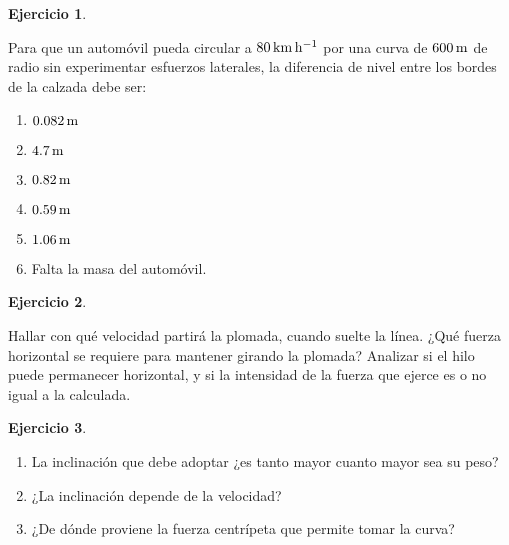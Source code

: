 \documentclass[a4paper,12pt,twoside]{book}
\newtheorem{ejercicio}{{Ejercicio}}[chapter]
\begin{document}
\begin{mdframed}[style=ejercicio-intermedio]
    \begin{ejercicio}
    \end{ejercicio}
    Para que un automóvil pueda circular a $80 \, \si{\kilo\metre\per\hour}$ por una curva de $600 \, \si{\metre}$ de radio sin experimentar esfuerzos laterales, la diferencia de nivel entre los bordes de la calzada debe ser:
    \begin{enumerate}
        \item $0.082 \, \si{\metre}$
        \item $4.7 \, \si{\metre}$
        \item $0.82 \, \si{\metre}$
        \item $0.59 \, \si{\metre}$
        \item $1.06 \, \si{\metre}$
        \item Falta la masa del automóvil.
    \end{enumerate}
\end{mdframed}

\begin{mdframed}[style=ejercicio-intermedio]
    \begin{ejercicio}
    \end{ejercicio}
    Hallar con qué velocidad partirá la plomada, cuando suelte la línea.
    ¿Qué fuerza horizontal se requiere para mantener girando la plomada?
    Analizar si el hilo puede permanecer horizontal, y si la intensidad de la fuerza que ejerce es o no igual a la calculada.
\end{mdframed}

\begin{mdframed}[style=ejercicio-intermedio]
    \begin{ejercicio}
    \end{ejercicio}
    \begin{enumerate}
        \item La inclinación que debe adoptar ¿es tanto mayor cuanto mayor sea su peso?
        \item ¿La inclinación depende de la velocidad?
        \item ¿De dónde proviene la fuerza centrípeta que permite tomar la curva?
    \end{enumerate}
\end{mdframed}
\end{document}
